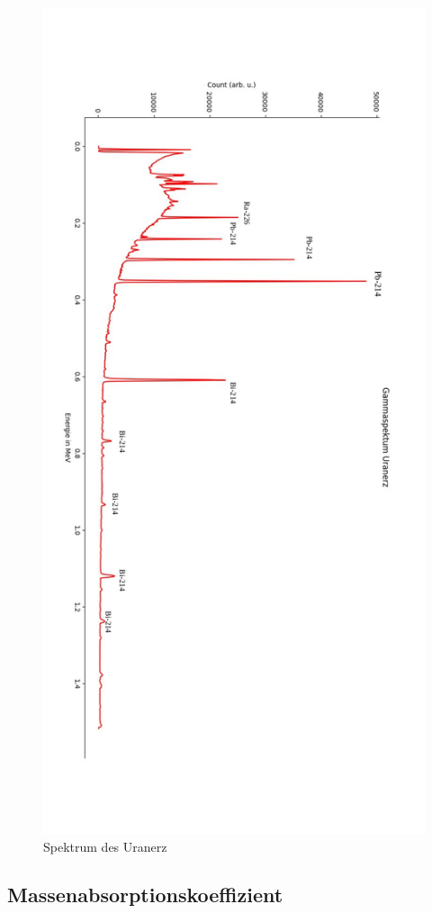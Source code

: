 \begin{figure}[h]
    \centering
    \includegraphics[width = 12cm]{Bilder/Auswertung/UranerzSpektrum.pdf}
    \caption{Spektrum des Uranerz}
    \label{Uranerz}
\end{figure}

\clearpage
\subsection{Massenabsorptionskoeffizient}

